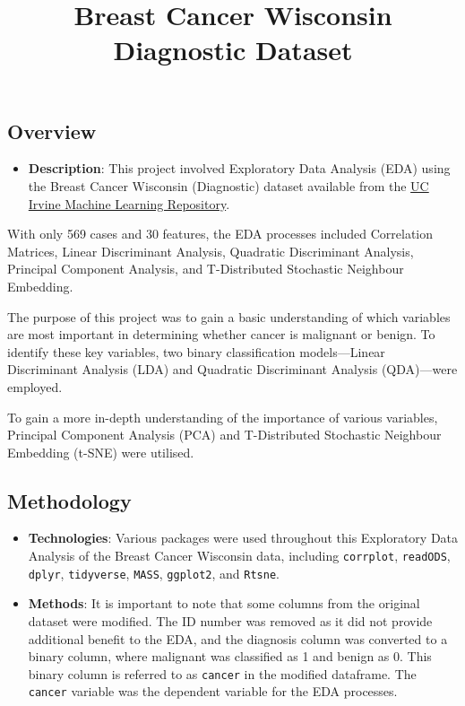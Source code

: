 \documentclass[
]{article}
\title{Breast Cancer Wisconsin Diagnostic Dataset}
\author{}
\date{\vspace{-2.5em}}
\providecommand{\tightlist}{%
  \setlength{\itemsep}{0pt}\setlength{\parskip}{0pt}}
\begin{document}
\maketitle

\subsection{Overview}\label{overview}

\begin{itemize}
\tightlist
\item
  \textbf{Description}: This project involved Exploratory Data Analysis
  (EDA) using the Breast Cancer Wisconsin (Diagnostic) dataset available
  from the
  \href{http://archive.ics.uci.edu/dataset/17/breast+cancer+wisconsin+diagnostic}{UC
  Irvine Machine Learning Repository}.
\end{itemize}

With only 569 cases and 30 features, the EDA processes included
Correlation Matrices, Linear Discriminant Analysis, Quadratic
Discriminant Analysis, Principal Component Analysis, and T-Distributed
Stochastic Neighbour Embedding.

The purpose of this project was to gain a basic understanding of which
variables are most important in determining whether cancer is malignant
or benign. To identify these key variables, two binary classification
models---Linear Discriminant Analysis (LDA) and Quadratic Discriminant
Analysis (QDA)---were employed.

To gain a more in-depth understanding of the importance of various
variables, Principal Component Analysis (PCA) and T-Distributed
Stochastic Neighbour Embedding (t-SNE) were utilised.

\subsection{Methodology}\label{methodology}

\begin{itemize}
\item
  \textbf{Technologies}: Various packages were used throughout this
  Exploratory Data Analysis of the Breast Cancer Wisconsin data,
  including \texttt{corrplot}, \texttt{readODS}, \texttt{dplyr},
  \texttt{tidyverse}, \texttt{MASS}, \texttt{ggplot2}, and
  \texttt{Rtsne}.
\item
  \textbf{Methods}: It is important to note that some columns from the
  original dataset were modified. The ID number was removed as it did
  not provide additional benefit to the EDA, and the diagnosis column
  was converted to a binary column, where malignant was classified as 1
  and benign as 0. This binary column is referred to as \texttt{cancer}
  in the modified dataframe. The \texttt{cancer} variable was the
  dependent variable for the EDA processes.
\end{itemize}
\end{document}
